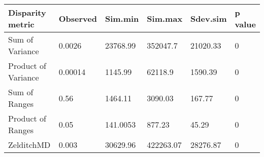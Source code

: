 
\begin{tabular}[t]{l l l l l l }		%
\hline
\textbf{Disparity metric} & \textbf{Observed} & \textbf{Sim.min} & \textbf{Sim.max} & \textbf{Sdev.sim} & \textbf{p value} \\
\hline
Sum of Variance & 0.0026 & 23768.99 & 352047.7 & 21020.33 &  0\\
Product of Variance	& 0.00014 &	1145.99 &	62118.9 &	1590.39 &	0\\
Sum of Ranges &	0.56 &	1464.11 &	3090.03 & 	167.77 & 0 \\
Product of Ranges & 0.05 &	141.0053 &	877.23 &	45.29 &	0\\
ZelditchMD & 0.003 & 30629.96 &	422263.07 &	28276.87 &	0\\

\hline
\end{tabular}